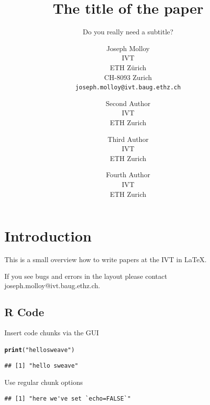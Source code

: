 \documentclass[numbered]{ivt-style/standard}\usepackage[]{graphicx}\usepackage[]{xcolor}
\title{The title of the paper}
\subtitle{Do you really need a subtitle?}
\author{
  Joseph Molloy \\
  IVT \\
  ETH Zürich \\
  CH-8093 Zurich \\
  \texttt{joseph.molloy@ivt.baug.ethz.ch}
  \and
  Second Author \\
  IVT \\
  ETH Zurich
  \and
  Third Author \\
  IVT \\
  ETH Zurich
  \and
  Fourth Author \\
  IVT \\
  ETH Zurich
}
\makeatletter
\newcommand{\hlstr}[1]{\textcolor[rgb]{0.192,0.494,0.8}{#1}}%
\newcommand{\hlstd}[1]{\textcolor[rgb]{0.345,0.345,0.345}{#1}}%
\newcommand{\hlkwd}[1]{\textcolor[rgb]{0.737,0.353,0.396}{\textbf{#1}}}%
\newenvironment{kframe}{%
 \def\at@end@of@kframe{}%
 \ifinner\ifhmode%
  \def\at@end@of@kframe{\end{minipage}}%
  \begin{minipage}{\columnwidth}%
 \fi\fi%
 \def\FrameCommand##1{\hskip\@totalleftmargin \hskip-\fboxsep
 \colorbox{shadecolor}{##1}\hskip-\fboxsep
     \hskip-\linewidth \hskip-\@totalleftmargin \hskip\columnwidth}%
 \MakeFramed {\advance\hsize-\width
   \@totalleftmargin\z@ \linewidth\hsize
   \@setminipage}}%
 {\par\unskip\endMakeFramed%
 \at@end@of@kframe}
\newenvironment{knitrout}{}{} %
\makeatother
\begin{document}
\maketitle
\clearpage


\tableofcontents
\listoftables
\listoffigures
\newpage






%
\section{Introduction}
%

This is a small overview how to write papers at the IVT in \LaTeX.

If you see bugs and errors in the layout please contact
joseph.molloy@ivt.baug.ethz.ch.

\subsection{R Code}

Insert code chunks via the GUI

\begin{knitrout}
\color{fgcolor}\begin{kframe}
\begin{alltt}
\hlkwd{print}\hlstd{(}\hlstr{"hello sweave"}\hlstd{)}
\end{alltt}
\begin{verbatim}
## [1] "hello sweave"
\end{verbatim}
\end{kframe}
\end{knitrout}

Use regular chunk options

\begin{knitrout}
\color{fgcolor}\begin{kframe}
\begin{verbatim}
## [1] "here we've set `echo=FALSE`"
\end{verbatim}
\end{kframe}
\end{knitrout}
\end{document}
